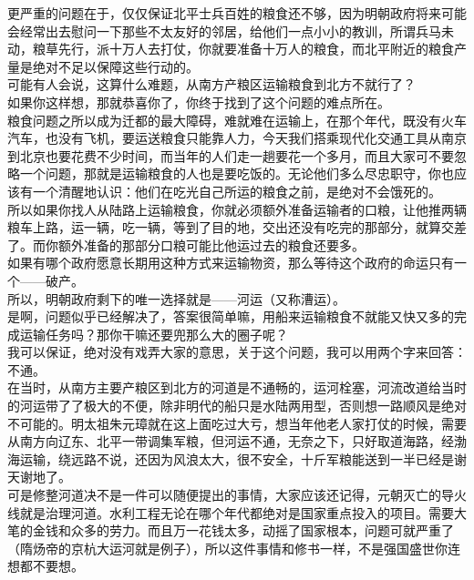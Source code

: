 \begin{multicols}{\theparacolNo}
更严重的问题在于，仅仅保证北平士兵百姓的粮食还不够，因为明朝政府将来可能会经常出去慰问一下那些不太友好的邻居，给他们一点小小的教训，所谓兵马未动，粮草先行，派十万人去打仗，你就要准备十万人的粮食，而北平附近的粮食产量是绝对不足以保障这些行动的。\\

可能有人会说，这算什么难题，从南方产粮区运输粮食到北方不就行了？\\

如果你这样想，那就恭喜你了，你终于找到了这个问题的难点所在。\\

粮食问题之所以成为迁都的最大障碍，难就难在运输上，在那个年代，既没有火车汽车，也没有飞机，要运送粮食只能靠人力，今天我们搭乘现代化交通工具从南京到北京也要花费不少时间，而当年的人们走一趟要花一个多月，而且大家可不要忽略一个问题，那就是运输粮食的人也是要吃饭的。无论他们多么尽忠职守，你也应该有一个清醒地认识：他们在吃光自己所运的粮食之前，是绝对不会饿死的。\\

所以如果你找人从陆路上运输粮食，你就必须额外准备运输者的口粮，让他推两辆粮车上路，运一辆，吃一辆，等到了目的地，交出还没有吃完的那部分，就算交差了。而你额外准备的那部分口粮可能比他运过去的粮食还要多。\\

如果有哪个政府愿意长期用这种方式来运输物资，那么等待这个政府的命运只有一个——破产。\\

所以，明朝政府剩下的唯一选择就是——河运（又称漕运）。\\

是啊，问题似乎已经解决了，答案很简单嘛，用船来运输粮食不就能又快又多的完成运输任务吗？那你干嘛还要兜那么大的圈子呢？\\

我可以保证，绝对没有戏弄大家的意思，关于这个问题，我可以用两个字来回答：\\

不通。\\

在当时，从南方主要产粮区到北方的河道是不通畅的，运河栓塞，河流改道给当时的河运带了了极大的不便，除非明代的船只是水陆两用型，否则想一路顺风是绝对不可能的。明太祖朱元璋就在这上面吃过大亏，想当年他老人家打仗的时候，需要从南方向辽东、北平一带调集军粮，但河运不通，无奈之下，只好取道海路，经渤海运输，绕远路不说，还因为风浪太大，很不安全，十斤军粮能送到一半已经是谢天谢地了。\\

可是修整河道决不是一件可以随便提出的事情，大家应该还记得，元朝灭亡的导火线就是治理河道。水利工程无论在哪个年代都绝对是国家重点投入的项目。需要大笔的金钱和众多的劳力。而且万一花钱太多，动摇了国家根本，问题可就严重了（隋炀帝的京杭大运河就是例子），所以这件事情和修书一样，不是强国盛世你连想都不要想。\\


\end{multicols}
